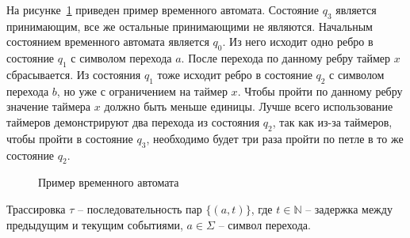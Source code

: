 \documentclass[times,specification,annotation]{itmo-student-thesis}
\begin{document}
\begin{example}
  На рисунке~\ref{time_automaton} приведен пример временного автомата. 
  Состояние $q_3$ является принимающим, все же остальные принимающими не являются. 
  Начальным состоянием временного автомата является $q_0$. 
  Из него исходит одно ребро в состояние $q_1$ с символом перехода $a$. 
  После перехода по данному ребру таймер $x$ сбрасывается. 
  Из состояния $q_1$ тоже исходит ребро в состояние $q_2$ с символом перехода $b$, но уже с ограничением на таймер $x$.
  Чтобы пройти по данному ребру значение таймера $x$ должно быть меньше единицы.
  Лучше всего использование таймеров демонстрируют два перехода из состояния $q_2$, так как из-за таймеров, 
  чтобы пройти в состояние $q_3$, необходимо будет три раза пройти по петле в то же состояние $q_2$.
  \label{time_aut_example}
\end{example}

\begin{figure}[!h]
\caption{Пример временного автомата}\label{time_automaton}
\centering
{}
\end{figure}

\begin{definition}
  Трассировка $\tau$ -- последовательность пар $\{\left( a, t \right)\}$, 
  где $t \in \mathbb{N}$ -- задержка между предыдущим и текущим событиями, $a \in \Sigma$ -- символ перехода.
\end{definition}
\end{document}
